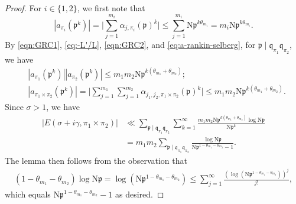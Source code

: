 \documentclass[10pt,a4paper]{amsart}
\newcommand{\N}{\mathrm{N}}
\newcommand{\kp}{\mathfrak{p}}
\newcommand{\kq}{\mathfrak{q}}
\begin{document}
	\begin{proof}
		For $i \in \{1,2\}$, we first note that 
		\begin{equation*}\label{eq:localroot}
			|a_{\pi_i}(\kp^k)| = \Big|\sum_{j=1}^{m_i} \alpha_{j,\pi_i}(\kp)^k \Big| \le \sum_{j=1}^{m_i} \N\kp^{k\theta_{m_i}} = m_i\N\kp^{k\theta_{m_i}}.
		\end{equation*}
		By \eqref{eqn:GRC1}, \eqref{eq:-L'/L},  \eqref{eqn:GRC2}, and \eqref{eq:a-rankin-selberg}, for $\kp  \mid \kq_{\pi_1}\kq_{\pi_2}$, we have
		\begin{equation*}\label{eq:localroot2}
        \begin{aligned}
        & |a_{\pi_1}(\kp^k)||a_{\pi_2}(\kp^k)| \le m_1m_2\N\kp^{k(\theta_{m_1}+\theta_{m_2})}; \\
        &|a_{\pi_1 \times \pi_2}(\kp^k)| =\Big|\sum_{j=1}^{m_1}\sum_{j=1}^{m_2} \alpha_{j_1,j_2, \pi_1 \times \pi_2}(\kp)^k\Big|  \le m_1m_2 \N\kp^{k(\theta_{m_1}+\theta_{m_2})}.
         \end{aligned}
		\end{equation*}
		Since $\sigma>1$, we have 
		\begin{equation*}\label{eq:error}
			\begin{aligned}
				|E(\sigma+ i\gamma, \pi_1 \times \pi_2)|
				&\ll  \sum_{\kp  \mid \kq_{\pi_1}\kq_{\pi_2}} \sum_{k=1}^{\infty} \frac{m_1m_2
                \N\kp^{k(\theta_{m_1}+\theta_{m_2})}\log \N\kp}{\N\kp^{k}} \\
                &=  m_1m_2\sum_{\kp  \mid \kq_{\pi_1}\kq_{\pi_2}}\frac{\log \N\kp}{\N\kp^{1-\theta_{m_1}-\theta_{m_2}}-1}.
			\end{aligned}
		\end{equation*}
        The lemma then follows from the observation that
	\begin{equation*}
			\begin{aligned}
		(1-\theta_{m_1}-\theta_{m_2})\log \N\kp =\log(\N\kp^{1-\theta_{m_1}-\theta_{m_2}})
        \leq \sum_{j=1}^{\infty}\frac{(\log(\N\kp^{1-\theta_{m_1} -\theta_{m_2}}))^{j}}{j!},
		\end{aligned} 
		\end{equation*} 
        which equals $\N\kp^{1-\theta_{m_1}-\theta_{m_2}}-1$ as desired. 
	\end{proof}
\end{document}
